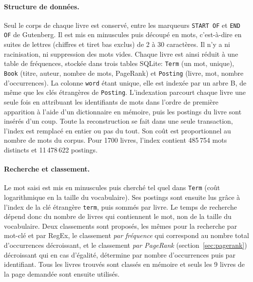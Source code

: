 \documentclass[11pt,a4paper]{article}
\begin{document}
\paragraph{Structure de données.}
Seul le corps de chaque livre est conservé, entre les marqueurs \texttt{START OF} et \texttt{END OF} de Gutenberg. Il est mis en minuscules puis découpé en mots, c'est-à-dire en suites de lettres (chiffres et tiret bas exclus) de 2 à 30 caractères. Il n'y a ni racinisation, ni suppression des mots vides. Chaque livre est ainsi réduit à une table de fréquences, stockée dans trois tables SQLite: \texttt{Term} (un mot, unique), \texttt{Book} (titre, auteur, nombre de mots, PageRank) et \texttt{Posting} (livre, mot, nombre d'occurrences). La colonne \texttt{word} étant unique, elle est indexée par un arbre B, de même que les clés étrangères de \texttt{Posting}. L'indexation parcourt chaque livre une seule fois en attribuant les identifiants de mots dans l'ordre de première apparition à l'aide d'un dictionnaire en mémoire, puis les postings du livre sont insérés d'un coup. Toute la reconstruction se fait dans une seule transaction, l'index est remplacé en entier ou pas du tout. Son coût est proportionnel au nombre de mots du corpus. Pour 1700 livres, l'index contient 485\,754 mots distincts et 11\,478\,622 postings.

\paragraph{Recherche et classement.}
Le mot saisi est mis en minuscules puis cherché tel quel dans \texttt{Term} (coût logarithmique en la taille du vocabulaire). Ses postings sont ensuite lus grâce à l'index de la clé étrangère \texttt{term}, puis sommés par livre. Le temps de recherche dépend donc du nombre de livres qui contiennent le mot, non de la taille du vocabulaire. Deux classements sont proposés, les mêmes pour la recherche par mot-clé et par RegEx, le classement \emph{par fréquence} qui correspond au nombre total d'occurrences décroissant, et le classement \emph{par PageRank} (section~\ref{sec:pagerank}) décroissant qui en cas d'égalité, détermine par nombre d'occurrences puis par identifiant. Tous les livres trouvés sont classés en mémoire et seuls les 9 livres de la page demandée sont ensuite utilisés.
\end{document}
